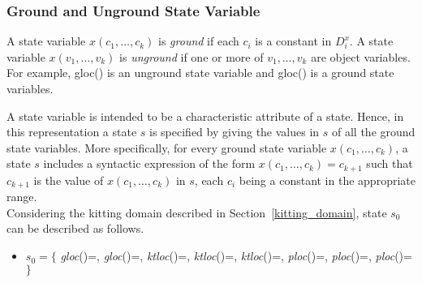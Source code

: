 \subsubsection{Ground and Unground State Variable}
A state variable $x(c_1,\dots,c_k)$ is \textit{ground} if each $c_i$ is a constant in $D_{i}^{x}$. A state variable $x(v_1,\dots,v_k)$ is \textit{unground} if one or more of $v_1,\dots,v_k$ are object variables. For example, gloc({}) is an unground state variable and gloc({}) is a ground state variables.


A state variable is intended to be a characteristic attribute of a state. Hence, in
this representation a state $s$ is specified by giving the values in $s$ of all the ground
state variables. More specifically, for every ground state variable $x(c_1,\dots,c_k)$, a state
$s$ includes a syntactic expression of the form $x(c_1,\dots,c_k)=c_{k+1}$ such that $c_{k+1}$ is
the value of $x(c_1,\dots,c_k)$ in $s$, each $c_i$ being a constant in the appropriate range.\\

Considering the kitting domain described in Section~\ref{kitting_domain}, state $s_0$ can be described as follows.


\begin{itemize}
\renewcommand{\labelitemi}{$\blacksquare$}
\renewcommand{\labelitemii}{$\square$}
\item $s_0=\lbrace$ \textit{gloc}({})=\chstation, \textit{gloc}({})={}, \textit{ktloc}({})={}, \textit{ktloc}({})={}, \textit{ktloc}({})={}, \textit{ploc}({})={}, \textit{ploc}({})={}, \textit{ploc}({})={} $\rbrace$
\end{itemize}





